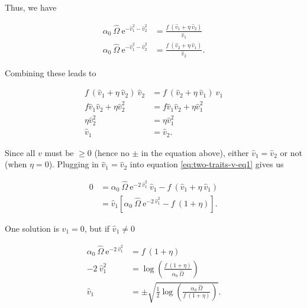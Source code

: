 \noindent Thus, we have

\begin{equation*}
\begin{split}
    \alpha_0 ~ \hat{\Omega} ~ \textrm{e}^{-\hat{v}_{1}^2 - \hat{v}_{2}^2} &=
        \frac{ f ~ ( \hat{v}_{1} + \eta ~ \hat{v}_{2} ) }{ \hat{v}_{1} } \\
    \alpha_0 ~ \hat{\Omega} ~ \textrm{e}^{-\hat{v}_{1}^2 - \hat{v}_{2}^2} &=
        \frac{ f ~ ( \hat{v}_{2} + \eta ~ \hat{v}_{1} ) }{ \hat{v}_{2} }
    \textrm{.}
\end{split}
\end{equation*}


\noindent Combining these leads to

\begin{equation*}
\begin{split}
    f ~ ( \hat{v}_{1} + \eta ~ \hat{v}_{2} ) ~ \hat{v}_{2} &=
        f ~ ( \hat{v}_{2} + \eta ~ \hat{v}_{1} ) ~ \hat{v}_{1} \\
    f \hat{v}_{1} \hat{v}_{2} + \eta \hat{v}_{2}^2 &=
        f \hat{v}_{1} \hat{v}_{2} + \eta \hat{v}_{1}^2 \\
    \eta \hat{v}_{2}^2 &= \eta \hat{v}_{1}^2 \\
    \hat{v}_{1} &= \hat{v}_{2}
    \textrm{.}
\end{split}
\end{equation*}

Since all $v$ must be $\ge 0$ (hence no $\pm$ in the equation above),
either $\hat{v}_{1} = \hat{v}_{2}$ or not (when $\eta = 0$).
Plugging in $\hat{v}_{1} = \hat{v}_{2}$ into equation \ref{eq:two-traits-v-eq1}
gives us

\begin{equation*}
\begin{split}
    0 &= \alpha_0 ~ \hat{\Omega} ~ \textrm{e}^{-2 ~ \hat{v}_{1}^2 } ~ \hat{v}_{1}
        - f ~ ( \hat{v}_{1} + \eta ~ \hat{v}_{1} ) \\
    &= \hat{v}_{1} \left[ \alpha_0 ~ \hat{\Omega} ~ \textrm{e}^{-2 ~ \hat{v}_{1}^2 }
        - f ~ ( 1 + \eta ) \right]
    \textrm{.}
\end{split}
\end{equation*}

\noindent One solution is $\hat{v}_{1} = 0$, but if $\hat{v}_{1} \ne 0$


\begin{equation}
\begin{split}
    \alpha_0 ~ \hat{\Omega} ~ \textrm{e}^{-2 ~ \hat{v}_{1}^2 } &=
        f ~ ( 1 + \eta ) \\
    -2 ~ \hat{v}_{1}^2 &=
        \log \left( \frac{ f ~ ( 1 + \eta ) }{ \alpha_0 ~ \hat{\Omega} } \right) \\
    \hat{v}_{1} &= \pm \sqrt{\frac{1}{2}
        \log \left( \frac{ \alpha_0 ~ \hat{\Omega} }{ f ~ ( 1 + \eta ) } \right) }
    \textrm{.}
\end{split}
\label{eq:two-traits-v-eq5}
\end{equation}



